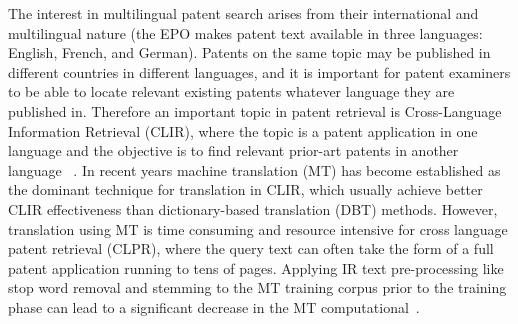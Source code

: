 The interest in multilingual patent search arises from their international and multilingual nature (the EPO makes patent text available in three languages: English, French, and German). Patents on the same topic may be published in different countries in different languages, and it is important for patent examiners to be able to locate relevant existing patents whatever language they are published in. Therefore an important topic in patent retrieval is Cross-Language Information Retrieval (CLIR), where the topic is a patent application in one language and the objective is to find relevant prior-art patents in another language ~\citep{lupu2013patent,joho2010survey, roda2010clef, DBLP:conf/clef/PiroiLHSMF12}. In recent years machine
translation (MT) has become established as the dominant technique for translation in CLIR, which usually achieve better CLIR effectiveness than dictionary-based translation (DBT) methods. However, translation using MT is time consuming and resource intensive for cross language patent retrieval (CLPR), where the query text can often take the form of a full patent application running to tens of pages. Applying IR text pre-processing like stop word removal and stemming to the MT training corpus prior to the training phase can lead to a significant decrease in the MT computational~\citep{magdy2013studying}.


